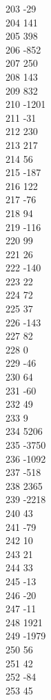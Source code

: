 { 203	-29 \\
 204	141 \\
 205	398 \\
 206	-852 \\
 207	250 \\
 208	143 \\
 209	832 \\
 210	-1201 \\
 211	-31 \\
 212	230 \\
 213	217 \\
 214	56 \\
 215	-187 \\
 216	122 \\
 217	-76 \\
 218	94 \\
 219	-116 \\
 220	99 \\
 221	26 \\
 222	-140 \\
 223	22 \\
 224	72 \\
 225	37 \\
 226	-143 \\
 227	82 \\
 228	0 \\
 229	-46 \\
 230	64 \\
 231	-60 \\
 232	49 \\
 233	9 \\
 234	5206 \\
 235	-3750 \\
 236	-1092 \\
 237	-518 \\
 238	2365 \\
 239	-2218 \\
 240	43 \\
 241	-79 \\
 242	10 \\
 243	21 \\
 244	33 \\
 245	-13 \\
 246	-20 \\
 247	-11 \\
 248	1921 \\
 249	-1979 \\
 250	56 \\
 251	42 \\
 252	-84 \\
 253	45 \\
}
